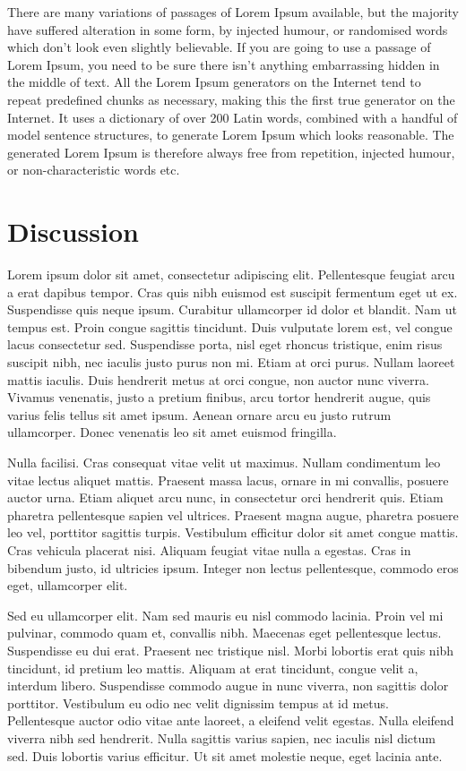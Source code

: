 \documentclass[a4paper]{article}
\begin{document}
\begin{multicols}{2}
There are many variations of passages of Lorem Ipsum available, but the majority have suffered alteration in some form, by injected humour, or randomised words which don't look even slightly believable. If you are going to use a passage of Lorem Ipsum, you need to be sure there isn't anything embarrassing hidden in the middle of text. All the Lorem Ipsum generators on the Internet tend to repeat predefined chunks as necessary, making this the first true generator on the Internet. It uses a dictionary of over 200 Latin words, combined with a handful of model sentence structures, to generate Lorem Ipsum which looks reasonable. The generated Lorem Ipsum is therefore always free from repetition, injected humour, or non-characteristic words etc.

\section{Discussion}
Lorem ipsum dolor sit amet, consectetur adipiscing elit. Pellentesque feugiat arcu a erat dapibus tempor. Cras quis nibh euismod est suscipit fermentum eget ut ex. Suspendisse quis neque ipsum. Curabitur ullamcorper id dolor et blandit. Nam ut tempus est. Proin congue sagittis tincidunt. Duis vulputate lorem est, vel congue lacus consectetur sed. Suspendisse porta, nisl eget rhoncus tristique, enim risus suscipit nibh, nec iaculis justo purus non mi. Etiam at orci purus. Nullam laoreet mattis iaculis. Duis hendrerit metus at orci congue, non auctor nunc viverra. Vivamus venenatis, justo a pretium finibus, arcu tortor hendrerit augue, quis varius felis tellus sit amet ipsum. Aenean ornare arcu eu justo rutrum ullamcorper. Donec venenatis leo sit amet euismod fringilla.

Nulla facilisi. Cras consequat vitae velit ut maximus. Nullam condimentum leo vitae lectus aliquet mattis. Praesent massa lacus, ornare in mi convallis, posuere auctor urna. Etiam aliquet arcu nunc, in consectetur orci hendrerit quis. Etiam pharetra pellentesque sapien vel ultrices. Praesent magna augue, pharetra posuere leo vel, porttitor sagittis turpis. Vestibulum efficitur dolor sit amet congue mattis. Cras vehicula placerat nisi. Aliquam feugiat vitae nulla a egestas. Cras in bibendum justo, id ultricies ipsum. Integer non lectus pellentesque, commodo eros eget, ullamcorper elit.

Sed eu ullamcorper elit. Nam sed mauris eu nisl commodo lacinia. Proin vel mi pulvinar, commodo quam et, convallis nibh. Maecenas eget pellentesque lectus. Suspendisse eu dui erat. Praesent nec tristique nisl. Morbi lobortis erat quis nibh tincidunt, id pretium leo mattis. Aliquam at erat tincidunt, congue velit a, interdum libero. Suspendisse commodo augue in nunc viverra, non sagittis dolor porttitor. Vestibulum eu odio nec velit dignissim tempus at id metus. Pellentesque auctor odio vitae ante laoreet, a eleifend velit egestas. Nulla eleifend viverra nibh sed hendrerit. Nulla sagittis varius sapien, nec iaculis nisl dictum sed. Duis lobortis varius efficitur. Ut sit amet molestie neque, eget lacinia ante.


\end{multicols}
\end{document}
